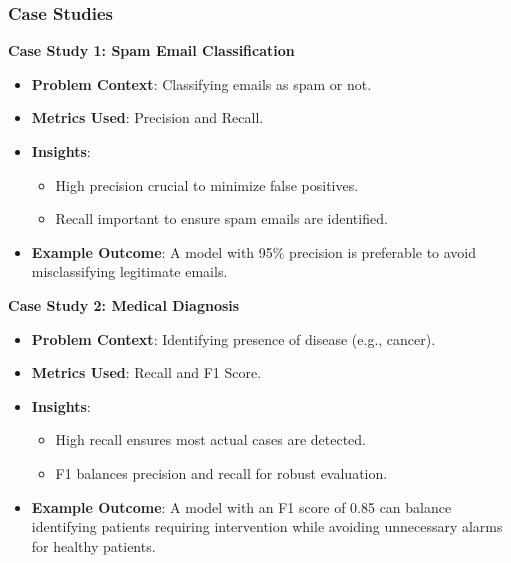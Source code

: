 \documentclass[aspectratio=169]{beamer}
\begin{document}
\begin{frame}[fragile]
    \frametitle{Case Studies}
    \textbf{Case Study 1: Spam Email Classification}
    \begin{itemize}
        \item \textbf{Problem Context}: Classifying emails as spam or not.
        \item \textbf{Metrics Used}: Precision and Recall.
        \item \textbf{Insights}: 
            \begin{itemize}
                \item High precision crucial to minimize false positives.
                \item Recall important to ensure spam emails are identified.
            \end{itemize}
        \item \textbf{Example Outcome}: 
            A model with 95\% precision is preferable to avoid misclassifying legitimate emails.
    \end{itemize}

    \textbf{Case Study 2: Medical Diagnosis}
    \begin{itemize}
        \item \textbf{Problem Context}: Identifying presence of disease (e.g., cancer).
        \item \textbf{Metrics Used}: Recall and F1 Score.
        \item \textbf{Insights}:
            \begin{itemize}
                \item High recall ensures most actual cases are detected.
                \item F1 balances precision and recall for robust evaluation.
            \end{itemize}
        \item \textbf{Example Outcome}:
            A model with an F1 score of 0.85 can balance identifying patients requiring intervention while avoiding unnecessary alarms for healthy patients.
    \end{itemize}
\end{frame}
\end{document}
